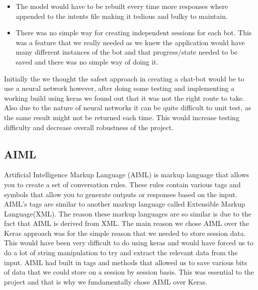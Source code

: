 \begin{itemize}
  \item The model would have to be rebuilt every time more responses where appended to the intents file making it tedious and bulky to maintain.
  \item There was no simple way for creating independent sessions for each bot. This was a feature that we really needed as we knew the application would have many different instances of the bot and that progress/state needed to be saved and there was no simple way of doing it.
\end{itemize}

Initially the we thought the safest approach in creating a chat-bot would be to use a neural network however, after doing some testing and implementing a working build using keras we found out that it was not the right route to take. Also due to the nature of neural networks it can be quite difficult to unit test, as the same result might not be returned each time. This would increase testing difficulty and decrease overall robustness of the project.

\subsection{AIML}
Artificial Intelligence Markup Language (AIML) is markup language that allows you to create a set of conversation rules\cite{AIChatBo91:online}. These rules contain various tags and symbols that allow you to generate outputs or responses based on the input. AIML's tags are similar to another markup language called Extensible Markup Language(XML). The reason these markup languages are so similar is due to the fact that AIML is derived from XML. The main reason we chose AIML over the Keras approach was for the simple reason that we needed to store session data. This would have been very difficult to do using keras and would have forced us to do a lot of string manipulation to try and extract the relevant data from the input. AIML had built in tags and methods that allowed us to save various bits of data that we could store on a session by session basis. This was essential to the project and that is why we fundamentally chose AIML over Keras.
\newline

